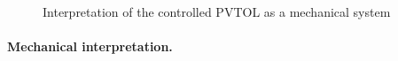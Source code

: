 \begin{figure}
 \centering
 
 \caption{Interpretation of the controlled PVTOL as a mechanical system}
 \label{fig:PVTOLPendulum}
\end{figure}

\paragraph{Mechanical interpretation.}

\cite{Konz:AT}


